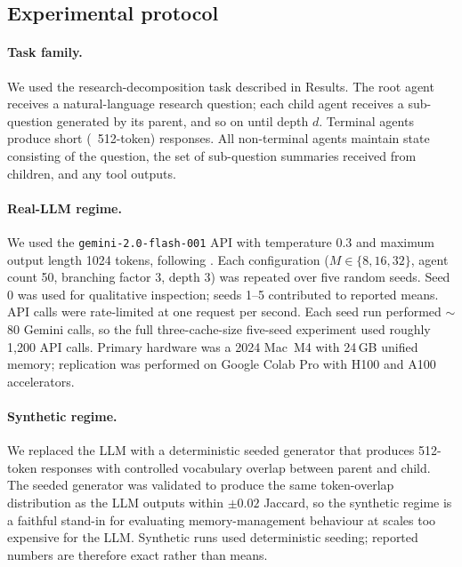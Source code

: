 \documentclass[fleqn,10pt]{article}
\theoremstyle{definition}
\newcommand{\slots}{M}
\begin{document}
\subsection*{Experimental protocol}

\paragraph{Task family.}
We used the research-decomposition task described in Results. The
root agent receives a natural-language research question; each child
agent receives a sub-question generated by its parent, and so on
until depth $d$. Terminal agents produce short (~512-token) responses.
All non-terminal agents maintain state consisting of the question,
the set of sub-question summaries received from children, and any
tool outputs.

\paragraph{Real-LLM regime.}
We used the \texttt{gemini-2.0-flash-001} API with temperature 0.3
and maximum output length 1024 tokens, following
\citep{team2024gemini}. Each configuration
($\slots \in \{8, 16, 32\}$, agent count 50, branching factor 3,
depth 3) was repeated over five random seeds. Seed 0 was used for
qualitative inspection; seeds 1--5 contributed to reported means.
API calls were rate-limited at one request per second. Each seed
run performed $\sim$80 Gemini calls, so the full three-cache-size
five-seed experiment used roughly 1,200 API calls. Primary
hardware was a 2024 Mac~M4 with 24\,GB unified memory; replication
was performed on Google Colab Pro with H100 and A100 accelerators.

\paragraph{Synthetic regime.}
We replaced the LLM with a deterministic seeded generator that
produces 512-token responses with controlled vocabulary overlap
between parent and child. The seeded generator was validated to
produce the same token-overlap distribution as the LLM outputs
within $\pm 0.02$ Jaccard, so the synthetic regime is a faithful
stand-in for evaluating memory-management behaviour at scales too
expensive for the LLM. Synthetic runs used deterministic seeding;
reported numbers are therefore exact rather than means.
\end{document}
